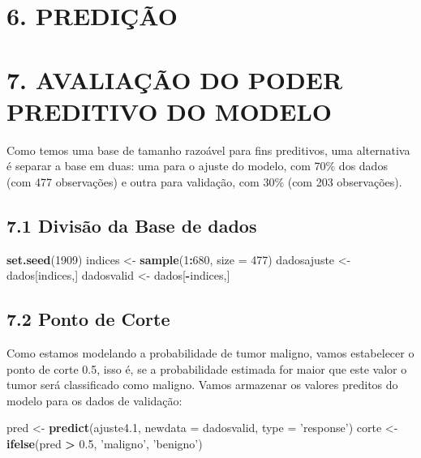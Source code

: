 \documentclass[]{article}
\newenvironment{Shaded}{\begin{snugshade}}{\end{snugshade}}
\newcommand{\KeywordTok}[1]{\textcolor[rgb]{0.13,0.29,0.53}{\textbf{#1}}}
\newcommand{\DataTypeTok}[1]{\textcolor[rgb]{0.13,0.29,0.53}{#1}}
\newcommand{\DecValTok}[1]{\textcolor[rgb]{0.00,0.00,0.81}{#1}}
\newcommand{\FloatTok}[1]{\textcolor[rgb]{0.00,0.00,0.81}{#1}}
\newcommand{\StringTok}[1]{\textcolor[rgb]{0.31,0.60,0.02}{#1}}
\newcommand{\OperatorTok}[1]{\textcolor[rgb]{0.81,0.36,0.00}{\textbf{#1}}}
\newcommand{\NormalTok}[1]{#1}
\begin{document}
\hypertarget{predicao}{%
\section{6. PREDIÇÃO}\label{predicao}}

\hypertarget{avaliacao-do-poder-preditivo-do-modelo}{%
\section{7. AVALIAÇÃO DO PODER PREDITIVO DO
MODELO}\label{avaliacao-do-poder-preditivo-do-modelo}}

Como temos uma base de tamanho razoável para fins preditivos, uma
alternativa é separar a base em duas: uma para o ajuste do modelo, com
70\% dos dados (com 477 observações) e outra para validação, com 30\%
(com 203 observações).

\hypertarget{divisao-da-base-de-dados}{%
\subsection{\texorpdfstring{\textbf{7.1 Divisão da Base de
dados}}{7.1 Divisão da Base de dados}}\label{divisao-da-base-de-dados}}

\begin{Shaded}
\begin{Highlighting}[]
\KeywordTok{set.seed}\NormalTok{(}\DecValTok{1909}\NormalTok{)}
\NormalTok{indices <-}\StringTok{ }\KeywordTok{sample}\NormalTok{(}\DecValTok{1}\OperatorTok{:}\DecValTok{680}\NormalTok{, }\DataTypeTok{size =} \DecValTok{477}\NormalTok{) }
\NormalTok{dadosajuste <-}\StringTok{ }\NormalTok{dados[indices,]}
\NormalTok{dadosvalid <-}\StringTok{ }\NormalTok{dados[}\OperatorTok{-}\NormalTok{indices,]}
\end{Highlighting}
\end{Shaded}

\hypertarget{ponto-de-corte}{%
\subsection{\texorpdfstring{\textbf{7.2 Ponto de
Corte}}{7.2 Ponto de Corte}}\label{ponto-de-corte}}

Como estamos modelando a probabilidade de tumor maligno, vamos
estabelecer o ponto de corte 0.5, isso é, se a probabilidade estimada
for maior que este valor o tumor será classificado como maligno. Vamos
armazenar os valores preditos do modelo para os dados de validação:

\begin{Shaded}
\begin{Highlighting}[]
\NormalTok{pred <-}\StringTok{ }\KeywordTok{predict}\NormalTok{(ajuste4}\FloatTok{.1}\NormalTok{, }\DataTypeTok{newdata =}\NormalTok{ dadosvalid, }\DataTypeTok{type =} \StringTok{'response'}\NormalTok{)}
\NormalTok{corte <-}\StringTok{ }\KeywordTok{ifelse}\NormalTok{(pred }\OperatorTok{>}\StringTok{ }\FloatTok{0.5}\NormalTok{, }\StringTok{'maligno'}\NormalTok{, }\StringTok{'benigno'}\NormalTok{)}
\end{Highlighting}
\end{Shaded}
\end{document}
